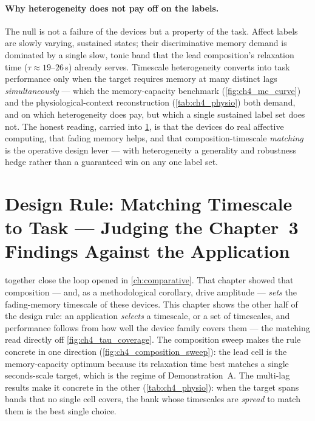 \documentclass[12pt, twoside]{report}
\begin{document}
\paragraph{Why heterogeneity does not pay off on the labels.} The null is not a failure of the devices but a property of the task. Affect labels are slowly varying, sustained states; their discriminative memory demand is dominated by a single slow, tonic band that the lead composition's relaxation time ($\tau \approx 19$--$26$\,s) already serves. Timescale heterogeneity converts into task performance only when the target requires memory at many distinct lags \emph{simultaneously} --- which the memory-capacity benchmark (\cref{fig:ch4_mc_curve}) and the physiological-context reconstruction (\cref{tab:ch4_physio}) both demand, and on which heterogeneity does pay, but which a single sustained label set does not. The honest reading, carried into \cref{sec:ch4_designrules}, is that the devices do real affective computing, that fading memory helps, and that composition-timescale \emph{matching} is the operative design lever --- with heterogeneity a generality and robustness hedge rather than a guaranteed win on any one label set.

\section[Design Rule: Matching Timescale to Task]{Design Rule: Matching Timescale to Task --- Judging the Chapter~3 Findings Against the Application}\label{sec:ch4_designrules}

 together close the loop opened in \cref{ch:comparative}. That chapter showed that composition --- and, as a methodological corollary, drive amplitude --- \emph{sets} the fading-memory timescale of these devices. This chapter shows the other half of the design rule: an application \emph{selects} a timescale, or a set of timescales, and performance follows from how well the device family covers them --- the matching read directly off \cref{fig:ch4_tau_coverage}. The composition sweep makes the rule concrete in one direction (\cref{fig:ch4_composition_sweep}): the lead cell is the memory-capacity optimum because its relaxation time best matches a single seconds-scale target, which is the regime of Demonstration~A. The multi-lag results make it concrete in the other (\cref{tab:ch4_physio}): when the target spans bands that no single cell covers, the bank whose timescales are \emph{spread} to match them is the best single choice.
\end{document}
